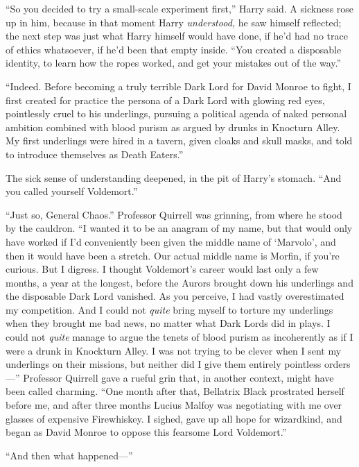 “So you decided to try a small-scale experiment first,” Harry said. A sickness
rose up in him, because in that moment Harry \emph{understood,} he saw himself
reflected; the next step was just what Harry himself would have done, if he’d
had no trace of ethics whatsoever, if he’d been that empty inside. “You created
a disposable identity, to learn how the ropes worked, and get your mistakes out
of the way.”

“Indeed. Before becoming a truly terrible Dark Lord for David Monroe to fight,
I first created for practice the persona of a Dark Lord with glowing red eyes,
pointlessly cruel to his underlings, pursuing a political agenda of naked
personal ambition combined with blood purism as argued by drunks in Knocturn
Alley. My first underlings were hired in a tavern, given cloaks and skull
masks, and told to introduce themselves as Death Eaters.”

The sick sense of understanding deepened, in the pit of Harry’s stomach. “And
you called yourself Voldemort.”

“Just so, General Chaos.” Professor Quirrell was grinning, from where he stood
by the cauldron. “I wanted it to be an anagram of my name, but that would only
have worked if I’d conveniently been given the middle name of ‘Marvolo’, and
then it would have been a stretch. Our actual middle name is Morfin, if you’re
curious. But I digress. I thought Voldemort’s career would last only a few
months, a year at the longest, before the Aurors brought down his underlings
and the disposable Dark Lord vanished. As you perceive, I had vastly
overestimated my competition. And I could not \emph{quite} bring myself to
torture my underlings when they brought me bad news, no matter what Dark Lords
did in plays. I could not \emph{quite} manage to argue the tenets of blood
purism as incoherently as if I were a drunk in Knockturn Alley. I was not
trying to be clever when I sent my underlings on their missions, but neither
did I give them entirely pointless orders—” Professor Quirrell gave a rueful
grin that, in another context, might have been called charming. “One month
after that, Bellatrix Black prostrated herself before me, and after three
months Lucius Malfoy was negotiating with me over glasses of expensive
Firewhiskey. I sighed, gave up all hope for wizardkind, and began as David
Monroe to oppose this fearsome Lord Voldemort.”

“And then what happened—”

